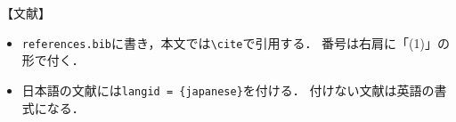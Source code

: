 \documentclass{classes/interim_presentation}
\newenvironment{akablock}{\par\color{red}\setlength{\parindent}{0pt}\setlength{\parskip}{.25\baselineskip}}{\par}
\newcommand{\cs}[1]{\texttt{\textbackslash #1}}
\begin{document}
\begin{akablock}
    【文献】
    \begin{itemize}
        \item \texttt{references.bib}に書き，本文では\cs{cite}で引用する．
        番号は右肩に「(1)」の形で付く．
        \item 日本語の文献には\texttt{langid = \{japanese\}}を付ける．
        付けない文献は英語の書式になる．
    \end{itemize}
\end{akablock}

\printinterimbibliography
\end{document}
